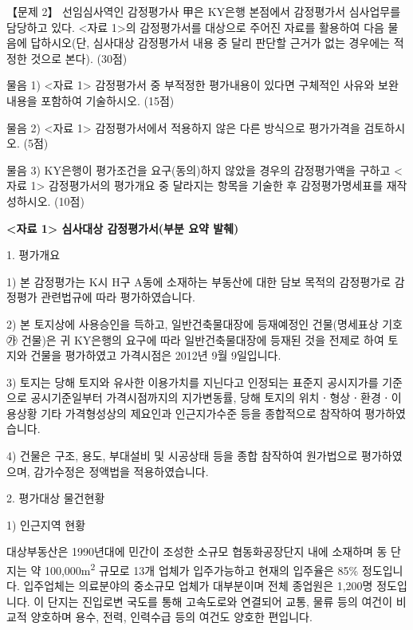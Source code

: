\begin{longquestion}{【문제 2】}
선임심사역인 감정평가사 甲은 KY은행 본점에서 감정평가서 심사업무를 담당하고 있다. <자료 1>의 감정평가서를 대상으로 주어진 자료를 활용하여 다음 물음에 답하시오(단, 심사대상 감정평가서 내용 중 달리 판단할 근거가 없는 경우에는 적정한 것으로 본다). (30점) \par
\medskip\noindent 물음 1) <자료 1> 감정평가서 중 부적정한 평가내용이 있다면 구체적인 사유와 보완내용을 포함하여 기술하시오. (15점) \par
\medskip\noindent 물음 2) <자료 1> 감정평가서에서 적용하지 않은 다른 방식으로 평가가격을 검토하시오. (5점) \par
\medskip\noindent 물음 3) KY은행이 평가조건을 요구(동의)하지 않았을 경우의 감정평가액을 구하고 <자료 1> 감정평가서의 평가개요 중 달라지는 항목을 기술한 후 감정평가명세표를 재작성하시오. (10점) \par
\textbf{<자료 1> 심사대상 감정평가서(부분 요약 발췌)} \par
1. 평가개요 \par
1) 본 감정평가는 K시 H구 A동에 소재하는 부동산에 대한 담보 목적의 감정평가로 감정평가 관련법규에 따라 평가하였습니다. \par
2) 본 토지상에 사용승인을 득하고, 일반건축물대장에 등재예정인 건물(명세표상 기호 ㉮ 건물)은 귀 KY은행의 요구에 따라 일반건축물대장에 등재된 것을 전제로 하여 토지와 건물을 평가하였고 가격시점은 2012년 9월 9일입니다. \par
3) 토지는 당해 토지와 유사한 이용가치를 지닌다고 인정되는 표준지 공시지가를 기준으로 공시기준일부터 가격시점까지의 지가변동률, 당해 토지의 위치ㆍ형상ㆍ환경ㆍ이용상황 기타 가격형성상의 제요인과 인근지가수준 등을 종합적으로 참작하여 평가하였습니다. \par
4) 건물은 구조, 용도, 부대설비 및 시공상태 등을 종합 참작하여 원가법으로 평가하였으며, 감가수정은 정액법을 적용하였습니다. \par
2. 평가대상 물건현황 \par
1) 인근지역 현황 \par
대상부동산은 1990년대에 민간이 조성한 소규모 협동화공장단지 내에 소재하며 동 단지는 약 100,000m\textsuperscript{2} 규모로 13개 업체가 입주가능하고 현재의 입주율은 85\% 정도입니다. 입주업체는 의료분야의 중소규모 업체가 대부분이며 전체 종업원은 1,200명 정도입니다. 이 단지는 진입로변 국도를 통해 고속도로와 연결되어 교통, 물류 등의 여건이 비교적 양호하며 용수, 전력, 인력수급 등의 여건도 양호한 편입니다. \par

\end{longquestion}
